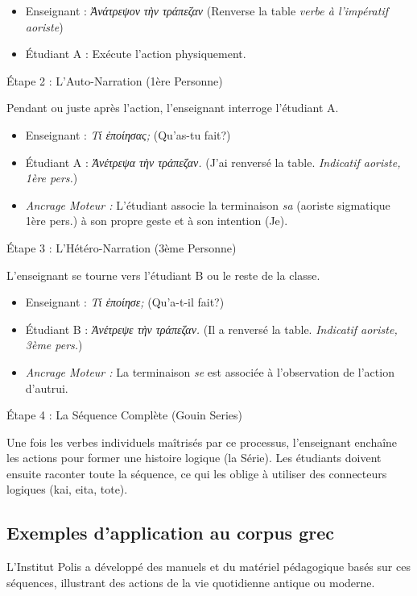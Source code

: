 \begin{itemize}\item Enseignant : \textit{Ἀνάτρεψον τὴν τράπεζαν\!} (Renverse la table\! \- \textit{verbe à l'impératif aoriste})\item Étudiant A : Exécute l'action physiquement.\end{itemize}Étape 2 : L'Auto-Narration (1ère Personne)

Pendant ou juste après l'action, l'enseignant interroge l'étudiant A.

\begin{itemize}\item Enseignant : \textit{Τί ἐποίησας;} (Qu'as-tu fait?)\item Étudiant A : \textit{Ἀνέτρεψα τὴν τράπεζαν.} (J'ai renversé la table. \- \textit{Indicatif aoriste, 1ère pers.})\item \textit{Ancrage Moteur :} L'étudiant associe la terminaison \textit{\-sa} (aoriste sigmatique 1ère pers.) à son propre geste et à son intention (\og Je\fg{}).\end{itemize}Étape 3 : L'Hétéro-Narration (3ème Personne)

L'enseignant se tourne vers l'étudiant B ou le reste de la classe.

\begin{itemize}\item Enseignant : \textit{Τί ἐποίησε;} (Qu'a-t-il fait?)\item Étudiant B : \textit{Ἀνέτρεψε τὴν τράπεζαν.} (Il a renversé la table. \- \textit{Indicatif aoriste, 3ème pers.})\item \textit{Ancrage Moteur :} La terminaison \textit{\-se} est associée à l'observation de l'action d'autrui.\end{itemize}Étape 4 : La Séquence Complète (Gouin Series)

Une fois les verbes individuels maîtrisés par ce processus, l'enseignant enchaîne les actions pour
former une histoire logique (la \og Série\fg{}). Les étudiants doivent ensuite raconter toute la
séquence, ce qui les oblige à utiliser des connecteurs logiques (kai, eita, tote).



\subsection{Exemples d'application au corpus grec}

L'Institut Polis a développé des manuels et du matériel pédagogique basés sur ces séquences,
illustrant des actions de la vie quotidienne antique ou moderne.\cite{III-2-2-ref19}

